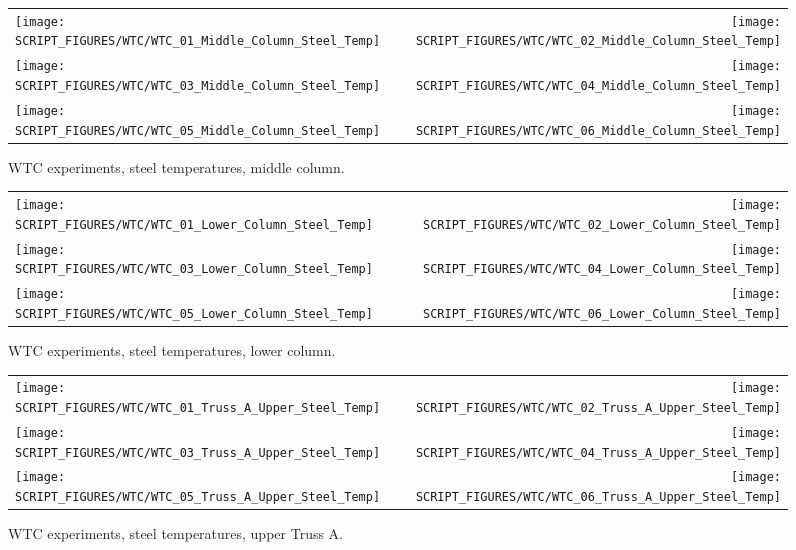 \begin{figure}[p]
\begin{tabular*}{\textwidth}{l@{\extracolsep{\fill}}r}
\texttt{[image: SCRIPT\_FIGURES/WTC/WTC\_01\_Middle\_Column\_Steel\_Temp]} &
\texttt{[image: SCRIPT\_FIGURES/WTC/WTC\_02\_Middle\_Column\_Steel\_Temp]} \\
\texttt{[image: SCRIPT\_FIGURES/WTC/WTC\_03\_Middle\_Column\_Steel\_Temp]} &
\texttt{[image: SCRIPT\_FIGURES/WTC/WTC\_04\_Middle\_Column\_Steel\_Temp]} \\
\texttt{[image: SCRIPT\_FIGURES/WTC/WTC\_05\_Middle\_Column\_Steel\_Temp]} &
\texttt{[image: SCRIPT\_FIGURES/WTC/WTC\_06\_Middle\_Column\_Steel\_Temp]}
\end{tabular*}
\caption[WTC experiments, steel temperatures, middle column]{WTC experiments, steel temperatures, middle column.}
\label{NIST_WTC_Middle_Column_Steel}
\end{figure}

\begin{figure}[p]
\begin{tabular*}{\textwidth}{l@{\extracolsep{\fill}}r}
\texttt{[image: SCRIPT\_FIGURES/WTC/WTC\_01\_Lower\_Column\_Steel\_Temp]} &
\texttt{[image: SCRIPT\_FIGURES/WTC/WTC\_02\_Lower\_Column\_Steel\_Temp]} \\
\texttt{[image: SCRIPT\_FIGURES/WTC/WTC\_03\_Lower\_Column\_Steel\_Temp]} &
\texttt{[image: SCRIPT\_FIGURES/WTC/WTC\_04\_Lower\_Column\_Steel\_Temp]} \\
\texttt{[image: SCRIPT\_FIGURES/WTC/WTC\_05\_Lower\_Column\_Steel\_Temp]} &
\texttt{[image: SCRIPT\_FIGURES/WTC/WTC\_06\_Lower\_Column\_Steel\_Temp]}
\end{tabular*}
\caption[WTC experiments, steel temperatures, lower column]{WTC experiments, steel temperatures, lower column.}
\label{NIST_WTC_Lower_Column_Steel}
\end{figure}

\begin{figure}[p]
\begin{tabular*}{\textwidth}{l@{\extracolsep{\fill}}r}
\texttt{[image: SCRIPT\_FIGURES/WTC/WTC\_01\_Truss\_A\_Upper\_Steel\_Temp]} &
\texttt{[image: SCRIPT\_FIGURES/WTC/WTC\_02\_Truss\_A\_Upper\_Steel\_Temp]} \\
\texttt{[image: SCRIPT\_FIGURES/WTC/WTC\_03\_Truss\_A\_Upper\_Steel\_Temp]} &
\texttt{[image: SCRIPT\_FIGURES/WTC/WTC\_04\_Truss\_A\_Upper\_Steel\_Temp]} \\
\texttt{[image: SCRIPT\_FIGURES/WTC/WTC\_05\_Truss\_A\_Upper\_Steel\_Temp]} &
\texttt{[image: SCRIPT\_FIGURES/WTC/WTC\_06\_Truss\_A\_Upper\_Steel\_Temp]}
\end{tabular*}
\caption[WTC experiments, steel temperatures, upper Truss A]{WTC experiments, steel temperatures, upper Truss A.}
\label{NIST_WTC_Truss_A_Upper_Steel_Temp}
\end{figure}

